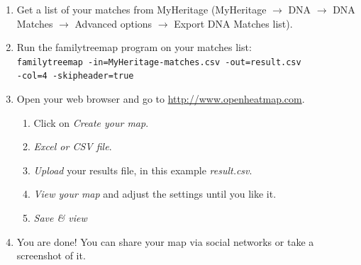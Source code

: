 \documentclass[12pt,a4paper]{article}
\begin{document}
\begin{enumerate}
\item Get a list of your matches from MyHeritage
	(MyHeritage $\rightarrow$ DNA $\rightarrow$ DNA Matches
	$\rightarrow$ Advanced options $\rightarrow$ Export DNA Matches list).
\item Run the familytreemap program on your matches list:\\
  \texttt{familytreemap -in=MyHeritage-matches.csv -out=result.csv \\
	-col=4 -skipheader=true}
\item Open your web browser and go to
      \href{http://www.openheatmap.com/}{http://www.openheatmap.com}.
	\begin{enumerate}
	\item Click on \emph{Create your map}.
	\item \emph{Excel or CSV file}.
	\item \emph{Upload} your results file,
            in this example \emph{result.csv}.
	\item \emph{View your map} and adjust the settings until you like it.
	\item \emph{Save \& view}
	\end{enumerate}
\item You are done! You can share your map via social networks
  or take a screenshot of it.
\end{enumerate}
\end{document}
